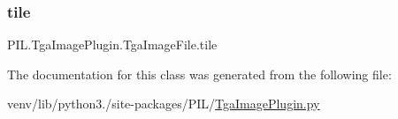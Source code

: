 \mbox{\label{classPIL_1_1TgaImagePlugin_1_1TgaImageFile_ae3e5952f936dce0cb053958f53b3ef38}} 
\subsubsection{\texorpdfstring{tile}{tile}}
{\footnotesize\ttfamily P\+I\+L.\+Tga\+Image\+Plugin.\+Tga\+Image\+File.\+tile}



The documentation for this class was generated from the following file\+:\begin{DoxyCompactItemize}
\item 
venv/lib/python3./site-\/packages/\+P\+I\+L/\hyperlink{TgaImagePlugin_8py}{Tga\+Image\+Plugin.\+py}\end{DoxyCompactItemize}
